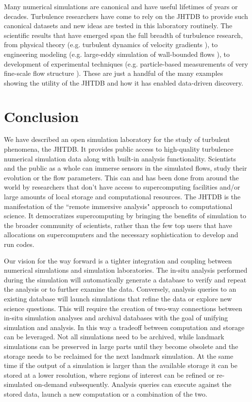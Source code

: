 \documentclass[10pt,twocolumn]{article}
\begin{document}
Many numerical simulations are canonical and have useful lifetimes of years or decades. Turbulence researchers have come to rely on the JHTDB to 
provide such canonical datasets and new ideas are tested in this laboratory routinely. The scientific results that have emerged span the full breadth of 
turbulence research, from physical theory (e.g. turbulent dynamics of velocity gradients \cite{luethi2009expanding}), to engineering modeling 
(e.g. large-eddy simulation of wall-bounded flows \cite{gungor2010new}), to development of experimental techniques 
(e.g. particle-based measurements of very fine-scale flow structure \cite{lawson2014scanning}).
These are just a handful of the many examples showing the utility of the 
JHTDB and how it has enabled data-driven discovery.

\section{Conclusion}
We have described an open simulation laboratory for the study of turbulent phenomena, the JHTDB. It provides public access to high-quality turbulence 
numerical simulation data along with built-in analysis functionality. Scientists and the public as a whole can immerse sensors in the simulated flows, study
their evolution or the flow parameters. This can and has been done from around the world by researchers that don't have access to supercomputing facilities
and/or large amounts of local storage and computational resources. The JHTDB is the manifestation of the ``remote immersive analysis" approach to 
computational science. It democratizes supercomputing by bringing the benefits of simulation to the broader community of scientists, rather than the
few top users that have allocations on supercomputers and the necessary sophistication to develop and run codes.

Our vision for the way forward is a tighter integration and coupling between numerical simulations and simulation laboratories. The in-situ analysis
performed during the simulation will automatically generate a database to verify and repeat the analysis or to further examine the data. Conversely, 
analysis queries to an existing database will launch simulations that refine the data or explore new science questions. This will require the creation of
two-way connections between in-situ simulation analyses and archival databases with the goal of unifying simulation and analysis. 
{\color{red}In this way a tradeoff between computation and storage can be leveraged. Not all simulations need to be archived, while landmark simulations 
can be preserved in large parts until they become obsolete and the storage needs to be reclaimed for the next landmark simulation. At the same time
if the output of a simulation is larger than the available storage it can be stored at a lower resolution, where regions of interest can be refined or re-simulated
on-demand subsequently. Analysis queries can execute against the stored data, launch a new computation or a combination of the two.}
\end{document}
